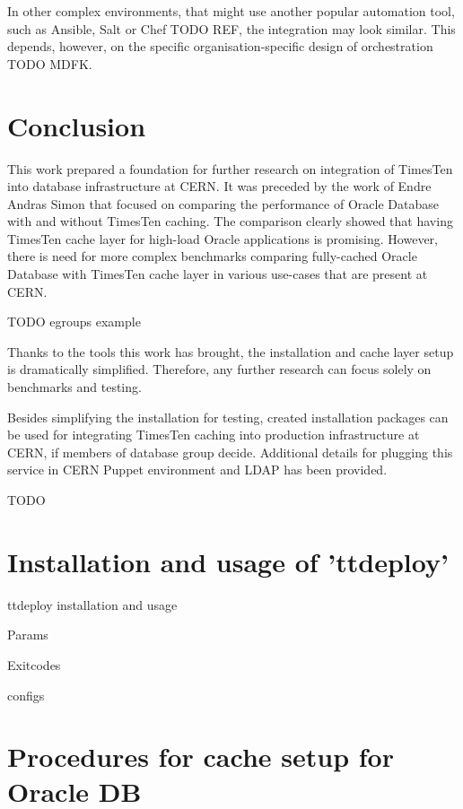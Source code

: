 \documentclass[11pt, letterpaper]{article}
\begin{document}
In other complex environments, that might use another popular automation tool, such as Ansible, Salt or Chef TODO REF, the integration may look similar. This depends, however, on the specific organisation-specific design of orchestration TODO MDFK.


\section{Conclusion}

This work prepared a foundation for further research on integration of TimesTen into database infrastructure at CERN. It was preceded by the work of Endre Andras Simon that focused on comparing the performance of Oracle Database with and without TimesTen caching. The comparison clearly showed that having TimesTen cache layer for high-load Oracle applications is promising. However, there is need for more complex benchmarks comparing fully-cached Oracle Database with TimesTen cache layer in various use-cases that are present at CERN.

TODO egroups example

Thanks to the tools this work has brought, the installation and cache layer setup is dramatically simplified. Therefore, any further research can focus solely on benchmarks and testing.

Besides simplifying the installation for testing, created installation packages can be used for integrating TimesTen caching into production infrastructure at CERN, if members of database group decide. Additional details for plugging this service in CERN Puppet environment and LDAP has been provided.

TODO

\newpage


\appendix

\printglossaries
\glsaddall

\section{Installation and usage of 'ttdeploy'}
ttdeploy installation and usage

Params

Exitcodes

configs

\section{Procedures for cache setup for Oracle DB}

\newpage
{}

\end{document}
